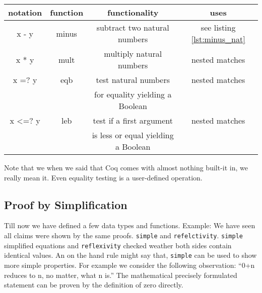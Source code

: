    \begin{center}
   \begin{tabular}{|c|c|c|c|}
     \hline 
 	  notation      & function        & functionality                       & uses           \\  \hline
 	  x - y         & minus           & subtract two natural numbers       & see listing  \ref{lst:minus_nat} \\  \hline
      x * y         & mult            & multiply natural numbers            & nested matches \\  \hline   
   	  x =? y        & eqb             & test natural numbers                & nested matches \\  
  	                &                 & for equality yielding a Boolean     &                \\  \hline
   	  x <=? y       & leb             & test if a first argument            & nested matches \\  
   	                &                 & is less or equal yielding a Boolean &                \\  \hline
   \end{tabular}
   \end{center}
	Note that we when we said that Coq comes with almost nothing built-it in, we really mean it.
    Even equality testing is a user-defined operation.
    
    
        
   \subsection{Proof by Simplification}
   
   
   Till now we have defined a few data types and functions.
   Example: We have seen all claims were shown by the same proofs. \lstinline!simple! and \lstinline!refelctivity!. 
   \lstinline!simple! simplified equations and \lstinline!reflexivity! checked weather both sides contain identical values.
   An on the hand rule might say that, \lstinline!simple! can be used to show more simple properties.
   For example we consider the following observation: ``0+n reduces to n, no matter, what n is.''
   The mathematical precisely formulated statement can be proven by the definition of zero directly.
   
